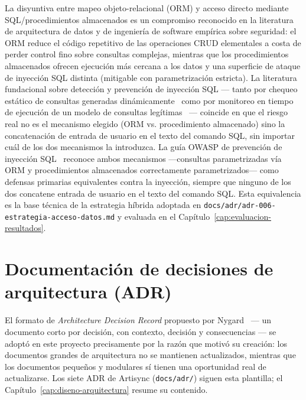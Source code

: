 La disyuntiva entre mapeo objeto-relacional (ORM) y acceso directo
mediante SQL/procedimientos almacenados es un compromiso reconocido en la
literatura de arquitectura de datos y de ingeniería de software empírica
sobre seguridad: el ORM reduce el código repetitivo de las operaciones
CRUD elementales a costa de perder control fino sobre consultas complejas,
mientras que los procedimientos almacenados ofrecen ejecución más cercana
a los datos y una superficie de ataque de inyección SQL distinta
(mitigable con parametrización estricta). La literatura fundacional sobre
detección y prevención de inyección SQL --- tanto por chequeo estático de
consultas generadas dinámicamente~\cite{GOULD2004} como por monitoreo en
tiempo de ejecución de un modelo de consultas legítimas~\cite{HALFOND2005}
--- coincide en que el riesgo real no es el mecanismo elegido (ORM vs.
procedimiento almacenado) sino la concatenación de entrada de usuario en
el texto del comando SQL, sin importar cuál de los dos mecanismos la
introduzca. La guía OWASP de prevención de inyección
SQL~\cite{OWASPSQLI} reconoce ambos mecanismos ---consultas parametrizadas
vía ORM y procedimientos almacenados correctamente parametrizados--- como
defensas primarias equivalentes contra la inyección, siempre que ninguno
de los dos concatene entrada de usuario en el texto del comando SQL. Esta
equivalencia es la base técnica de la estrategia híbrida adoptada en
\texttt{docs/adr/adr-006-estrategia-acceso-datos.md} y evaluada en el
Capítulo~\ref{cap:evaluacion-resultados}.

\section{Documentación de decisiones de arquitectura (ADR)}

El formato de \emph{Architecture Decision Record} propuesto por
Nygard~\cite{NYGARD2011} --- un documento corto por decisión, con
contexto, decisión y consecuencias --- se adoptó en este proyecto
precisamente por la razón que motivó su creación: los documentos grandes
de arquitectura no se mantienen actualizados, mientras que los documentos
pequeños y modulares sí tienen una oportunidad real de actualizarse. Los
siete ADR de Artisync (\texttt{docs/adr/}) siguen esta plantilla; el
Capítulo~\ref{cap:diseno-arquitectura} resume su contenido.
